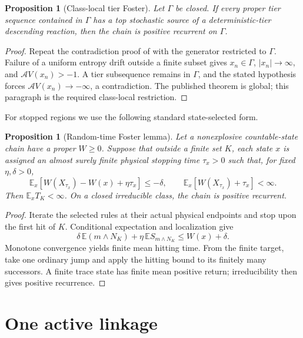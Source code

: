 \documentclass[11pt]{article}
\newtheorem{proposition}[theorem]{Proposition}
\theoremstyle{definition}
\theoremstyle{remark}
\newcommand{\cA}{\mathcal A}
\newcommand{\1}{\mathbf 1}
\begin{document}
\begin{proposition}[Class-local tier Foster]\label{prop:class-tier}
Let $\Gamma$ be closed.  If every proper tier sequence contained in $\Gamma$
has a top stochastic source of a deterministic-tier descending reaction, then
the chain is positive recurrent on $\Gamma$.
\end{proposition}

\begin{proof}
Repeat the contradiction proof of \cite[Theorem~9]{AndersonKim2018} with
the generator restricted to $\Gamma$.  Failure of a uniform entropy drift
outside a finite subset gives $x_n\in\Gamma$, $|x_n|\to\infty$, and
$\cA V(x_n)>-1$.  A tier subsequence remains in $\Gamma$, and the stated
hypothesis forces $\cA V(x_n)\to-\infty$, a contradiction.  The published
theorem is global; this paragraph is the required class-local restriction.
\end{proof}

For stopped regions we use the following standard state-selected form.

\begin{proposition}[Random-time Foster lemma]\label{prop:random-foster}
Let a nonexplosive countable-state chain have a proper $W\ge0$.  Suppose that
outside a finite set $K$, each state $x$ is assigned an almost surely finite
physical stopping time $\tau_x>0$ such that, for fixed $\eta,\delta>0$,
\begin{equation}\label{eq:random-foster}
 \mathbb E_x[W(X_{\tau_x})-W(x)+\eta\tau_x]\le-\delta,
 \qquad
 \mathbb E_x[W(X_{\tau_x})+\tau_x]<\infty.
\end{equation}
Then $\mathbb E_xT_K<\infty$.  On a closed irreducible class, the chain is
positive recurrent.
\end{proposition}

\begin{proof}
Iterate the selected rules at their actual physical endpoints and stop upon
the first hit of $K$.  Conditional expectation and localization give
\[
 \delta\,\mathbb E(m\wedge N_K)
 +\eta\,\mathbb E S_{m\wedge N_K}\le W(x)+\delta.
\]
Monotone convergence yields finite mean hitting time.  From the finite target,
take one ordinary jump and apply the hitting bound to its finitely many
successors.  A finite trace state has finite mean positive return; irreducibility
then gives positive recurrence.
\end{proof}

\section{One active linkage}
\end{document}
